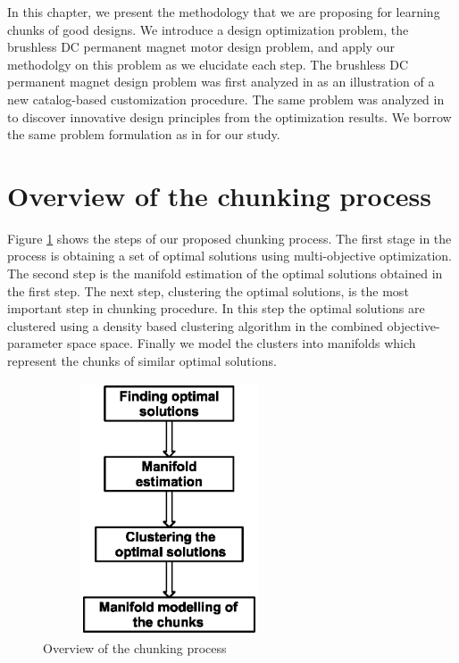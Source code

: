 
In this chapter, we present the methodology that we are
proposing for learning chunks of good designs. We introduce a  
design optimization problem, the brushless DC permanent magnet motor 
design problem, and apply our methodolgy on this problem as we 
elucidate each step. The brushless DC permanent magnet design problem 
was first analyzed in \cite{chidambaram1999} as an illustration of a 
new catalog-based customization procedure. The same problem 
was analyzed in \cite{deb2008} to discover 
innovative design principles from the optimization results. We borrow 
the same problem formulation as in \cite{deb2008} for our study.

\section{Overview of the chunking process}
Figure \ref{overview} shows the steps of our proposed chunking 
process. The first stage in the process is obtaining a set of optimal 
solutions using multi-objective optimization. The second step is the 
manifold estimation of the optimal solutions obtained in the first 
step. The next step, clustering the optimal solutions, is the most
important step in chunking procedure. In this step the optimal 
solutions are clustered using a density based clustering algorithm in 
the combined objective-parameter space space. Finally we model the 
clusters into manifolds which represent the chunks of similar 
optimal solutions.
 
\begin{figure}[ht]\begin{center}
 \includegraphics[width=75mm, height=75mm]{dia/overview.eps}
 \caption{Overview of the chunking process}
 \label{overview}
\end{center}\end{figure}



